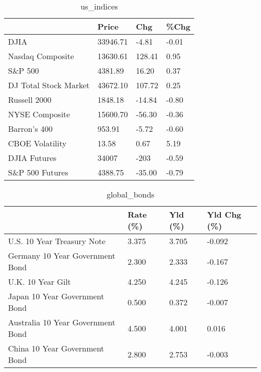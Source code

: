 \documentclass{article}%
\begin{document}
%


\begin{table}[htbp]%
\caption{us\_indices}%
\centering%
\begin{adjustbox}{width=1\textwidth}%
\begin{tabular}{llll}
\toprule
                      &    Price &    Chg &  \%Chg \\
\midrule
                 DJIA & 33946.71 &  -4.81 & -0.01 \\
     Nasdaq Composite & 13630.61 & 128.41 &  0.95 \\
              S\&P 500 &  4381.89 &  16.20 &  0.37 \\
DJ Total Stock Market & 43672.10 & 107.72 &  0.25 \\
         Russell 2000 &  1848.18 & -14.84 & -0.80 \\
       NYSE Composite & 15600.70 & -56.30 & -0.36 \\
         Barron's 400 &   953.91 &  -5.72 & -0.60 \\
      CBOE Volatility &    13.58 &   0.67 &  5.19 \\
         DJIA Futures &    34007 &   -203 & -0.59 \\
      S\&P 500 Futures &  4388.75 & -35.00 & -0.79 \\
\bottomrule
\end{tabular}
%
\end{adjustbox}%
\end{table}

%


\begin{table}[htbp]%
\caption{global\_bonds}%
\centering%
\begin{adjustbox}{width=1\textwidth}%
\begin{tabular}{llll}
\toprule
                                  & Rate (\%) & Yld (\%) & Yld Chg (\%) \\
\midrule
       U.S. 10 Year Treasury Note &    3.375 &   3.705 &      -0.092 \\
  Germany 10 Year Government Bond &    2.300 &   2.333 &      -0.167 \\
                U.K. 10 Year Gilt &    4.250 &   4.245 &      -0.126 \\
    Japan 10 Year Government Bond &    0.500 &   0.372 &      -0.007 \\
Australia 10 Year Government Bond &    4.500 &   4.001 &       0.016 \\
    China 10 Year Government Bond &    2.800 &   2.753 &      -0.003 \\
\bottomrule
\end{tabular}
%
\end{adjustbox}%
\end{table}
\end{document}
